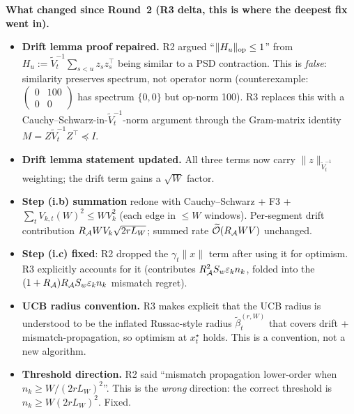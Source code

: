 \textbf{What changed since Round~2 (R3 delta, this is where the deepest fix went in).}
\begin{itemize}[leftmargin=*,itemsep=1pt,topsep=1pt]
\item \textbf{Drift lemma proof repaired.} R2 argued ``$\|H_u\|_{\mathrm{op}}\le 1$''
from $H_u:=\widetilde V_t^{-1}\sum_{s<u}z_sz_s^\top$ being similar to a
PSD contraction. This is \emph{false}: similarity preserves spectrum,
not operator norm (counterexample: $\begin{pmatrix}0&100\\0&0\end{pmatrix}$
has spectrum $\{0,0\}$ but op-norm 100). R3 replaces this with a
Cauchy--Schwarz-in-$\widetilde V_t^{-1}$-norm argument through the
Gram-matrix identity $M = Z\widetilde V_t^{-1}Z^\top\preceq I$.
\item \textbf{Drift lemma statement updated.} All three terms now
carry $\|z\|_{\widetilde V_t^{-1}}$ weighting; the drift term gains a
$\sqrt W$ factor.
\item \textbf{Step (i.b) summation} redone with Cauchy--Schwarz + F3 +
$\sum_t V_{k,t}(W)^2\le WV_k^2$ (each edge in $\le W$ windows). Per-segment
drift contribution $R_{\mathcal{A}} WV_k\sqrt{2rL_W}$; summed rate $\widetilde{\mathcal{O}}(R_{\mathcal{A}} WV)$
unchanged.
\item \textbf{Step (i.c) fixed}: R2 dropped the $\gamma_t\|x\|$ term
after using it for optimism. R3 explicitly accounts for it
(contributes $R_{\mathcal{A}}^2 S_w\varepsilon_k n_k$, folded into the
$(1+R_{\mathcal{A}})R_{\mathcal{A}} S_w\varepsilon_k n_k$ mismatch regret).
\item \textbf{UCB radius convention.} R3 makes explicit that the UCB
radius is understood to be the inflated Russac-style radius
$\widetilde\beta_t^{(r,W)}$ that covers drift + mismatch-propagation,
so optimism at $x_t^\star$ holds. This is a convention, not a new
algorithm.
\item \textbf{Threshold direction.} R2 said ``mismatch propagation
lower-order when $n_k\ge W/(2rL_W)^2$''. This is the \emph{wrong}
direction: the correct threshold is $n_k\ge W(2rL_W)^2$. Fixed.
\end{itemize}

